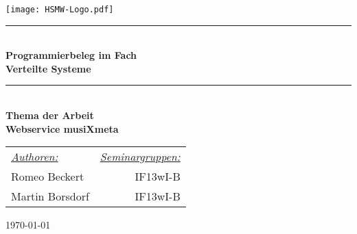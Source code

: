 \begin{titlepage}

\begin{center}


\texttt{[image: HSMW-Logo.pdf]}

\vspace{2cm}
\newcommand{\HRule}{\rule{\linewidth}{0.5mm}}
\HRule \\[0.4cm]
{ \huge \bfseries Programmierbeleg im Fach\\ \glqq Verteilte Systeme\grqq}\\[0.4cm]

\HRule \\[1.5cm]

{\huge \bfseries Thema der Arbeit\\ \vspace{0.5cm} Webservice musiXmeta}
\vspace{2cm}


\large
\begin{tabular}{lr}
\emph{\underline{Authoren:}} \hspace{5cm} & \emph{\underline{Seminargruppen:}}\vspace{0.5cm}\\
\vspace{0.5cm}Romeo Beckert \hspace{5cm} & IF13wI-B\\
Martin Borsdorf \hspace{5cm} & IF13wI-B\\
\end{tabular} 

 




\vfill

{\large \today}

\end{center}

\end{titlepage}